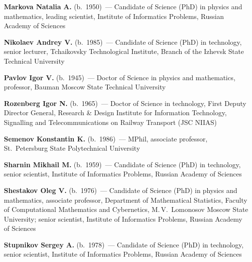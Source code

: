 \begin{multicols}{2}
\noindent
\textbf{Markova Natalia A.} (b.\ 1950)~--- Candidate of Science (PhD) in
physics and mathematics, leading scientist,  
Institute of Informatics Problems, Russian Academy of Sciences

\vspace*{5pt}

\noindent
\textbf{Nikolaev Andrey V.} (b.\ 1985)~--- Candidate of Science (PhD) in technology, 
senior lecturer, Tchaikovsky Technological Institute, Branch of the Izhevsk State Technical 
University

\vspace*{6pt}

\noindent
\textbf{Pavlov Igor V.} (b.\ 1945)~---  Doctor of Science in physics and mathematics,
professor, Bauman Moscow State Technical University

\vspace*{6pt}


\noindent
\textbf{Rozenberg Igor N.} (b.\ 1965)~--- Doctor of Science in technology, 
First Deputy Director General, Research \& Design Institute for Information 
Technology, Signalling and Telecommunications on Railway Transport (JSC NIIAS)

\vspace*{6pt}


\noindent
\textbf{Semenov Konstantin K.} (b.\ 1986)~--- MPhil, 
associate professor, St.\ Petersburg State Polytechnical University

\vspace*{6pt}

\noindent
\textbf{Sharnin Mikhail M.} (b.\ 1959)~--- Candidate of Science (PhD) 
in technology, senior scientist, Institute of Informatics Problems, Russian Academy of Sciences

\vspace*{6pt}

\noindent 
\textbf{Shestakov Oleg V.} (b.\ 1976)~--- Candidate of Science (PhD) in physics and mathematics,
associate professor, Department of Mathematical Statistics, Faculty of Computational Mathematics and Cybernetics,
M.\,V.~Lomonosov Moscow State University; senior scientist, Institute of Informatics Problems, 
Russian Academy of Sciences

\vspace*{6pt}

\noindent
\textbf{Stupnikov Sergey A.} (b.\ 1978)~--- Candidate of Science (PhD) in technology, 
senior scientist, Institute of Informatics Problems, Russian Academy of Sciences 


\end{multicols}
